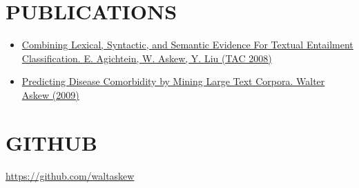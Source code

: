 \documentclass[line,margin]{res}
\begin{document}
\begin{resume}
\section{PUBLICATIONS}
\begin{itemize}
\item \href{http://www.nist.gov/tac/publications/2008/participant.papers/Emory.proceedings.pdf}{Combining Lexical, Syntactic, and Semantic Evidence For
  Textual Entailment Classification.  E. Agichtein, W. Askew, Y. Liu
  (TAC 2008)}
\item \href{https://etd.library.emory.edu/view/record/pid/emory:1b6tn}
  {Predicting Disease Comorbidity by Mining Large Text
    Corpora. Walter Askew (2009)}
\end{itemize}

\section{GITHUB}
\href{https://github.com/waltaskew}{https://github.com/waltaskew}

\end{resume}
\end{document}
